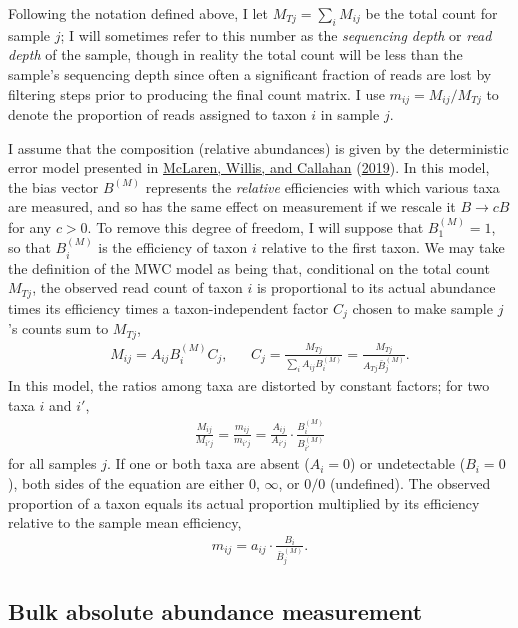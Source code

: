 \documentclass[
]{article}
\theoremstyle{definition}
\theoremstyle{definition}
\theoremstyle{definition}
\theoremstyle{definition}
\theoremstyle{remark}
\begin{document}
Following the notation defined above, I let \(M_{Tj} = \sum_i M_{ij}\) be the total count for sample \(j\); I will sometimes refer to this number as the \emph{sequencing depth} or \emph{read depth} of the sample, though in reality the total count will be less than the sample's sequencing depth since often a significant fraction of reads are lost by filtering steps prior to producing the final count matrix.
I use \(m_{ij} = M_{ij} / M_{Tj}\) to denote the proportion of reads assigned to taxon \(i\) in sample \(j\).

I assume that the composition (relative abundances) is given by the deterministic error model presented in \protect\hyperlink{ref-mclaren2019cons}{McLaren, Willis, and Callahan} (\protect\hyperlink{ref-mclaren2019cons}{2019}).
In this model, the bias vector \(B^{(M)}\) represents the \emph{relative} efficiencies with which various taxa are measured, and so has the same effect on measurement if we rescale it \(B \to cB\) for any \(c > 0\).
To remove this degree of freedom, I will suppose that \(B^{(M)}_{1} = 1\), so that \(B^{(M)}_i\) is the efficiency of taxon \(i\) relative to the first taxon.
We may take the definition of the MWC model as being that, conditional on the total count \(M_{Tj}\), the observed read count of taxon \(i\) is proportional to its actual abundance times its efficiency times a taxon-independent factor \(C_j\) chosen to make sample \(j\)'s counts sum to \(M_{Tj}\),
\begin{align}
  \label{eq:M}
  M_{ij} = A_{ij} B^{(M)}_{i} C_j, && 
  C_j = \frac{M_{Tj}}{\sum_i A_{ij} B^{(M)}_{i}}
      = \frac{M_{Tj}}{A_{Tj} \bar B^{(M)}_j}.
\end{align}
In this model, the ratios among taxa are distorted by constant factors; for two taxa \(i\) and \(i'\),
\begin{align}
  \label{eq:M-ratio}
  \frac{M_{ij}}{M_{i'j}} 
    = \frac{m_{ij}}{m_{i'j}} 
    = \frac{A_{ij}}{A_{i'j}} \cdot \frac{B^{(M)}_{i}}{B^{(M)}_{i'}}
\end{align}
for all samples \(j\).
If one or both taxa are absent (\(A_i = 0\)) or undetectable (\(B_i = 0\)), both sides of the equation are either \(0\), \(\infty\), or \(0/0\) (undefined).
The observed proportion of a taxon equals its actual proportion multiplied by its efficiency relative to the sample mean efficiency,
\begin{align}
  \label{eq:m}
  m_{ij} = a_{ij} \cdot \frac{B_i}{\bar B^{(M)}_j}.
\end{align}

\hypertarget{bulk-absolute-abundance-measurement}{%
\subsection{Bulk absolute abundance measurement}\label{bulk-absolute-abundance-measurement}}
\end{document}
